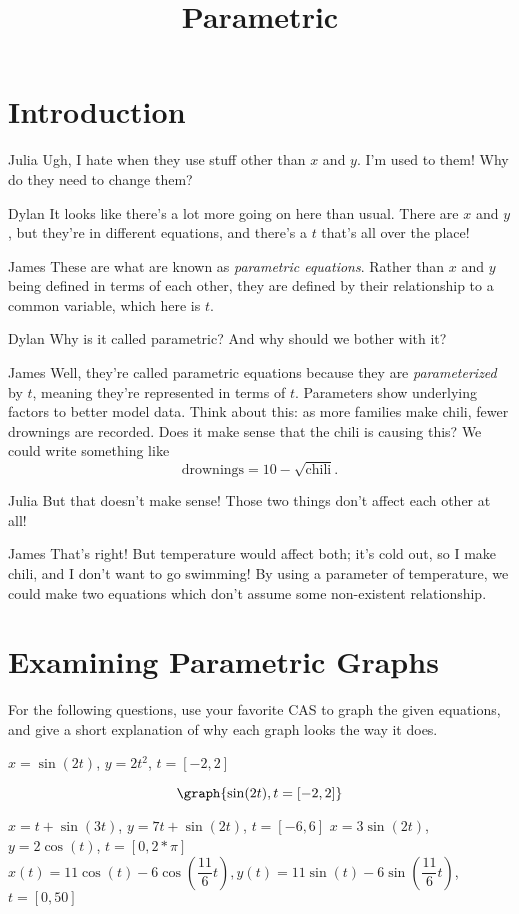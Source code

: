 \documentclass{ximera}
\title{Parametric}
\begin{document}
\maketitle
\section{Introduction}
\begin{dialogue}
\item[Julia] Ugh, I hate when they use stuff other than $x$ and $y$. I'm used to them! Why do they need to change them?
\item[Dylan] It looks like there's a lot more going on here than usual. There are $x$ and $y$, but they're in different equations, and there's a $t$ that's all over the place!
\item[James] These are what are known as \textit{parametric equations}. Rather than $x$ and $y$ being defined in terms of each other, they are defined by their relationship to a common variable, which here is $t$.
\item[Dylan] Why is it called parametric? And why should we bother with it?
\item[James] Well, they're called parametric equations because they are \textit{parameterized} by $t$, meaning they're represented in terms of $t$. Parameters show underlying factors to better model data. Think about this: as more families make chili, fewer drownings are recorded. Does it make sense that the chili is causing this? We could write something like $$\text{drownings} = 10 - \sqrt{\text{chili}}\text{.}$$
\item[Julia] But that doesn't make sense! Those two things don't affect each other at all!
\item[James] That's right! But temperature would affect both; it's cold out, so I make chili, and I don't want to go swimming! By using a parameter of temperature, we could make two equations which don't assume some non-existent relationship.
\end{dialogue}

\section{Examining Parametric Graphs}
For the following questions, use your favorite CAS to graph the given equations, and give a short explanation of why each graph looks the way it does.
\begin{question}
$x = \sin(2t)$, $y = 2t^2$, $t = [-2,2]$

\[
\graph{\sin(2t), t=[-2,2]}
\]


$x = t + \sin(3t)$, $y = 7t + \sin(2t)$, $t = [-6,6]$
$x = 3\sin(2t)$, $y = 2\cos(t)$, $t = [0,2*\pi]$
$x(t) = 11\cos(t) - 6\cos(\dfrac{11}{6}t), y(t) = 11\sin(t) - 6\sin(\dfrac{11}{6} t)$, $t = [0,50]$
\end{question}
\end{document}
